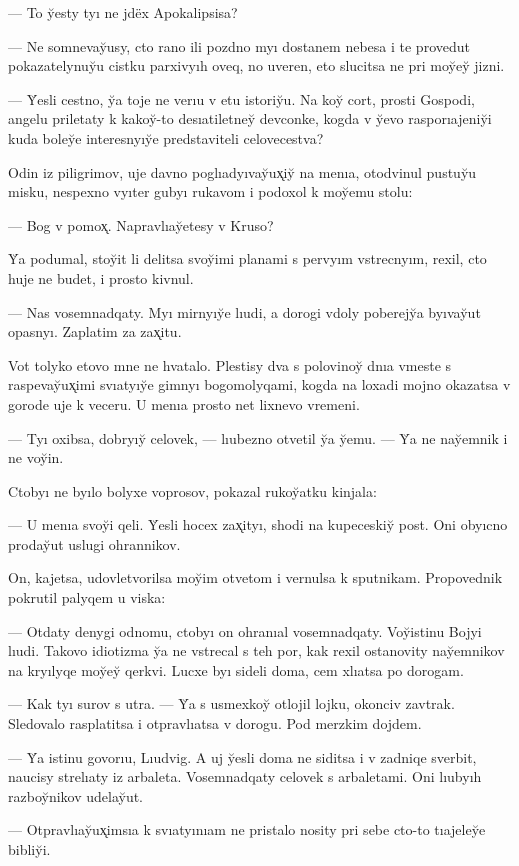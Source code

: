 \documentclass[10pt]{book}
\begin{document}
— To y̆esty tyı ne jdëx Apokalipsisa?

— Ne somnevay̆usy, cto rano ili pozdno myı dostanem nebesa i te provedut pokazatelynuy̆u cistku parxivyıh oveq, no uveren, eto slucitsa ne pri moy̆ey̆ jizni.

— Y̆esli cestno, y̆a toje ne verıu v etu istoriy̆u. Na koy̆ cort, prosti Gospodi, angelu priletaty k kakoy̆-to desıatiletney̆ devconke, kogda v y̆evo rasporıajeniy̆i kuda boley̆e interesnyıy̆e predstaviteli celovecestva?

Odin iz piligrimov, uje davno poglıadyıvay̆ux̨iy̆ na menıa, otodvinul pustuy̆u misku, nespexno vyıter gubyı rukavom i podoxol k moy̆emu stolu:

— Bog v pomox̨. Napravlıay̆etesy v Kruso?

Y̆a podumal, stoy̆it li delitsa svoy̆imi planami s pervyım vstrecnyım, rexil, cto huje ne budet, i prosto kivnul.

— Nas vosemnadqaty. Myı mirnyıy̆e lıudi, a dorogi vdoly poberejy̆a byıvay̆ut opasnyı. Zaplatim za zax̨itu.

Vot tolyko etovo mne ne hvatalo. Plestisy dva s polovinoy̆ dnıa vmeste s raspevay̆ux̨imi svıatyıy̆e gimnyı bogomolyqami, kogda na loxadi mojno okazatsa v gorode uje k veceru. U menıa prosto net lixnevo vremeni.

— Tyı oxibsa, dobryıy̆ celovek, — lıubezno otvetil y̆a y̆emu. — Y̆a ne nay̆emnik i ne voy̆in.

Ctobyı ne byılo bolyxe voprosov, pokazal rukoy̆atku kinjala:

— U menıa svoy̆i qeli. Y̆esli hocex zax̨ityı, shodi na kupeceskiy̆ post. Oni obyıcno proday̆ut uslugi ohrannikov.

On, kajetsa, udovletvorilsa moy̆im otvetom i vernulsa k sputnikam. Propovednik pokrutil palyqem u viska:

— Otdaty denygi odnomu, ctobyı on ohranıal vosemnadqaty. Voy̆istinu Bojyi lıudi. Takovo idiotizma y̆a ne vstrecal s teh por, kak rexil ostanovity nay̆emnikov na kryılyqe moy̆ey̆ qerkvi. Lucxe byı sideli doma, cem xlıatsa po dorogam.

— Kak tyı surov s utra. — Y̆a s usmexkoy̆ otlojil lojku, okonciv zavtrak. Sledovalo rasplatitsa i otpravlıatsa v dorogu. Pod merzkim dojdem.

— Y̆a istinu govorıu, Lıudvig. A uj y̆esli doma ne siditsa i v zadniqe sverbit, naucisy strelıaty iz arbaleta. Vosemnadqaty celovek s arbaletami. Oni lıubyıh razboy̆nikov udelay̆ut.

— Otpravlıay̆ux̨imsıa k svıatyınıam ne pristalo nosity pri sebe cto-to tıajeley̆e bibliy̆i.
\end{document}
